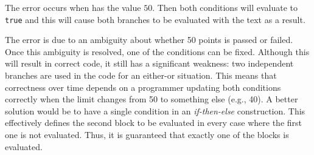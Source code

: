The error occurs when  has the value $50$. Then both conditions will evaluate to \texttt{true} and this will cause both branches to be evaluated with the text  as a result.

The error is due to an ambiguity about whether 50 points is passed or failed. Once this ambiguity is resolved, one of the conditions can be fixed. Although this will result in correct code, it still has a significant weakness: two independent branches are used in the code for an either-or situation. This means that correctness over time depends on a programmer updating both conditions correctly when the limit changes from 50 to something else (e.g., 40). A better solution would be to have a single condition in an \textsl{if-then-else} construction. This effectively defines the second block to be evaluated in every case where the first one is not evaluated. Thus, it is guaranteed that exactly one of the blocks is evaluated.
